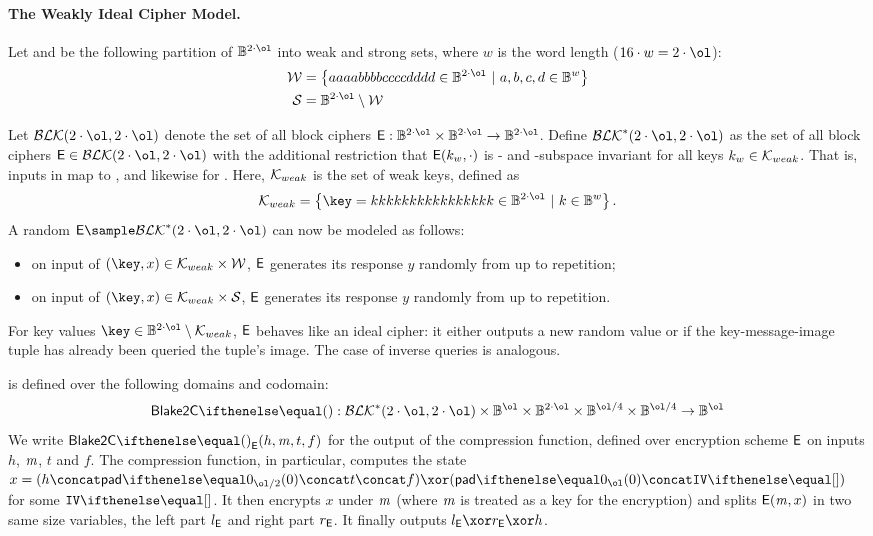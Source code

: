 \paragraph{The Weakly Ideal Cipher Model.}

Let \weakSet and \strongSet be the following partition of $\BB^{2 \cdot \ol}$ into weak and strong sets, where $w$ is the word length ($16 \cdot w = 2 \cdot \ol$):
\begin{align*}
    \weakSet &= \smallset{aaaabbbbccccdddd \in \BB^{2 \cdot \ol}\ |\ a, b, c, d \in \BB^w} \\
    \strongSet &= \BB^{2 \cdot \ol} \setminus \weakSet
\end{align*}

Let $\blockSet(2 \cdot \ol, 2 \cdot \ol)$ denote the set of all block ciphers $\Enc{}: \BB^{2 \cdot \ol}\times \BB^{2 \cdot \ol} \rightarrow \BB^{2 \cdot \ol}$. Define $\blockSet^{*}(2 \cdot \ol, 2 \cdot \ol)$ as the set of all block ciphers $\Enc \in \blockSet(2 \cdot \ol, 2 \cdot \ol)$ with the additional restriction that $\mathsf{E}(k_w,\cdot)$ is \weakSet- and \strongSet-subspace invariant for all keys $k_w \in \mathcal{K}_{weak}$. That is, inputs in \weakSet map to \weakSet, and likewise for \strongSet. Here, $\mathcal{K}_{weak}$ is the set of weak keys, defined as
\[
    \keyspace_{weak} = \smallset{ \key = kkkkkkkkkkkkkkkk \in \BB^{2 \cdot \ol}\ |\ k \in \BB^w }.
\]
A random $ \Enc \sample \blockSet^{*}(2 \cdot \ol, 2 \cdot \ol)$ can now be modeled as follows:
\begin{itemize}
    \item on input of $(\key, x) \in \keyspace_{weak} \times \weakSet$, $\mathsf{E}$ generates its response $y$ randomly from \weakSet up to repetition;
    \item on input of $(\key, x) \in \keyspace_{weak} \times \strongSet$, $\mathsf{E}$ generates its response $y$ randomly from \strongSet up to repetition.
\end{itemize}

For key values $\key \in \BB^{2 \cdot \ol} \setminus \keyspace_{weak}$, $\mathsf{E}$ behaves like an ideal cipher: it either outputs a new random value or if the key-message-image tuple has already been queried the tuple's image. The case of inverse queries is analogous.


 is defined over the following domains and codomain:
\[
    \blake{2C}{}: \blockSet^{*}(2 \cdot \ol, 2 \cdot \ol) \times \BB^{\ol} \times \BB^{2 \cdot \ol} \times \BB^{\ol/4} \times \BB^{\ol/4} \to \BB^{\ol}
\]
We write $\blake{2C}{}_\Enc(h, \msg, t, f)$ for the output of the  compression function, defined over encryption scheme $\mathsf{E}$ on inputs $h$, $\mathit{m}$, $t$ and $f$. The compression function, in particular, computes the state $x = (h \concat \pad{0}{\ol/2} \concat t \concat f) \xor (\pad{0}{\ol} \concat \blakeIV{})$ for some $\blakeIV{}$. It then encrypts $x$ under $\mathit{m}$ (where $\mathit{m}$ is treated as a key for the encryption) and splits $\mathsf{E}(\mathit{m}, x)$ in two same size variables, the left part $l_{\mathsf{E}}$ and right part $r_{\mathsf{E}}$. It finally outputs $l_\Enc \xor r_\Enc \xor h$.\linebreak

